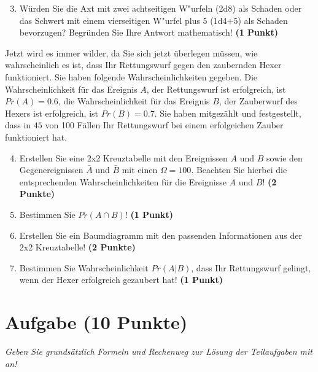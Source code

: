 \documentclass[a4paper, 10pt]{scrartcl}\usepackage[]{graphicx}\usepackage[]{xcolor}
\begin{document}
\begin{enumerate}
  \setcounter{enumi}{2}
\item W{\"u}rden Sie die Axt mit zwei achtseitigen W{"u}rfeln (2d8) als Schaden oder
  das Schwert mit einem vierseitigen W{"u}rfel plus 5 (1d4+5) als Schaden bevorzugen?
  Begr{\"u}nden Sie Ihre Antwort mathematisch! \textbf{(1 Punkt)}
\end{enumerate}

Jetzt wird es immer wilder, da Sie sich jetzt {\"u}berlegen m{\"u}ssen, wie
wahrscheinlich es ist, dass Ihr Rettungswurf gegen den zaubernden Hexer
funktioniert. Sie haben folgende Wahrscheinlichkeiten gegeben. Die
Wahrscheinlichkeit f{\"u}r das Ereignis $A$, der Rettungswurf ist erfolgreich,
ist $Pr(A) = 0.6$, die Wahrscheinlichkeit f{\"u}r das Ereignis $B$,
der Zauberwurf des Hexers ist erfolgreich, ist $Pr(B) = 0.7$. Sie
haben mitgez{\"a}hlt und festgestellt, dass in $45$ von 100 F{\"a}llen
Ihr Rettungswurf bei einem erfolgeichen Zauber funktioniert hat.  

\begin{enumerate}
  \setcounter{enumi}{3}
\item Erstellen Sie eine 2x2 Kreuztabelle mit den Ereignissen $A$ und $B$
  sowie den Gegenereignissen $\bar{A}$ und $\bar{B}$ mit einen
  $\Omega = 100$. Beachten Sie hierbei die entsprechenden
  Wahrscheinlichkeiten f{\"u}r die Ereignisse $A$ und $B$! \textbf{(2 Punkte)}
\item Bestimmen Sie $Pr(A \cap B)$! \textbf{(1 Punkt)}
\item Erstellen Sie ein Baumdiagramm mit den passenden Informationen aus der 2x2
  Kreuztabelle! \textbf{(2 Punkte)}
\item Bestimmen Sie Wahrscheinlichkeit $Pr(A|B)$, dass Ihr Rettungswurf gelingt, wenn
  der Hexer erfolgreich gezaubert hat! \textbf{(1 Punkt)}
\end{enumerate}

 
\clearpage\null 
\clearpage

\section{Aufgabe \hfill (10 Punkte)}

\textit{Geben Sie grunds{\"a}tzlich Formeln und Rechenweg zur L{\"o}sung der
  Teilaufgaben mit an!} \\[1Ex]
\end{document}
